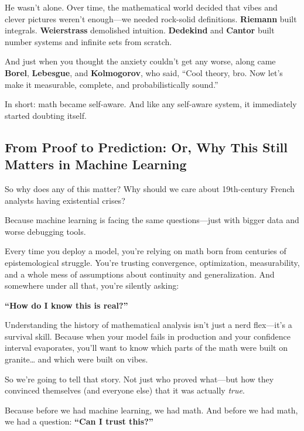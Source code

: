 He wasn’t alone. Over time, the mathematical world decided that vibes and clever pictures weren’t enough—we needed rock-solid definitions. \textbf{Riemann} built integrals. \textbf{Weierstrass} demolished intuition. \textbf{Dedekind} and \textbf{Cantor} built number systems and infinite sets from scratch.

And just when you thought the anxiety couldn’t get any worse, along came \textbf{Borel}, \textbf{Lebesgue}, and \textbf{Kolmogorov}, who said, “Cool theory, bro. Now let’s make it measurable, complete, and probabilistically sound.”

In short: math became self-aware. And like any self-aware system, it immediately started doubting itself.

\subsection{From Proof to Prediction: Or, Why This Still Matters in Machine Learning}

So why does any of this matter? Why should we care about 19th-century French analysts having existential crises?

Because machine learning is facing the same questions—just with bigger data and worse debugging tools.

Every time you deploy a model, you’re relying on math born from centuries of epistemological struggle. You’re trusting convergence, optimization, measurability, and a whole mess of assumptions about continuity and generalization. And somewhere under all that, you’re silently asking:

\textbf{“How do I know this is real?”}

Understanding the history of mathematical analysis isn’t just a nerd flex—it’s a survival skill. Because when your model fails in production and your confidence interval evaporates, you’ll want to know which parts of the math were built on granite… and which were built on vibes.

So we’re going to tell that story.  
Not just who proved what—but how they convinced themselves (and everyone else) that it was actually \emph{true}.

Because before we had machine learning, we had math.  
And before we had math, we had a question: \textbf{“Can I trust this?”}
